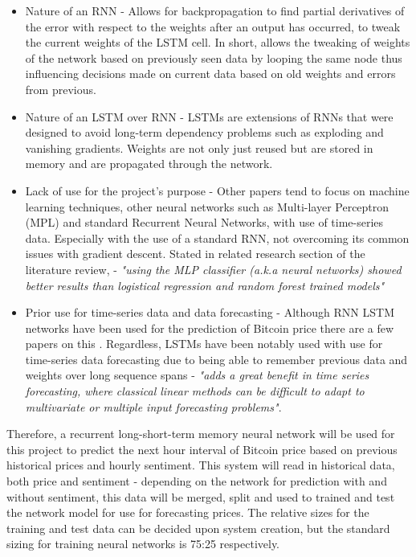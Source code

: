 \documentclass[oneside, 12pt]{article}
\begin{document}
		\begin{itemize}
			\item Nature of an RNN - Allows for backpropagation to find partial derivatives of the error with respect to the weights after an output has occurred, to tweak the current weights of the LSTM cell. In short, allows the tweaking of weights of the network based on previously seen data by looping the same node thus influencing decisions made on current data based on old weights and errors from previous.
			\item Nature of an LSTM over RNN - LSTMs are extensions of RNNs \cite{22} that were designed to avoid long-term dependency problems such as exploding and vanishing gradients. Weights are not only just reused but are stored in memory and are propagated through the network.
			\item Lack of use for the project's purpose - Other papers tend to focus on machine learning techniques, other neural networks such as Multi-layer Perceptron (MPL) and standard Recurrent Neural Networks, with use of time-series data. Especially with the use of a standard RNN, not overcoming its common issues with gradient descent. Stated in related research section of the literature review, \cite{5} - \textit{"using the MLP classifier (a.k.a neural networks) showed better results than logistical regression and random forest trained models"}
			\item Prior use for time-series data and data forecasting - Although RNN LSTM networks have been used for the prediction of Bitcoin price there are a few papers on this \cite{25}. Regardless, LSTMs have been notably used with use for time-series data forecasting due to being able to remember previous data and weights over long sequence spans \cite{25} - \textit{"adds a great benefit in time series forecasting, where classical linear methods can be difficult to adapt to multivariate or multiple input forecasting problems"}.
		\end{itemize}
	
		Therefore, a recurrent long-short-term memory neural network will be used for this project to predict the next hour interval of Bitcoin price based on previous historical prices and hourly sentiment. This system will read in historical data, both price and sentiment - depending on the network for prediction with and without sentiment, this data will be merged, split and used to trained and test the network model for use for forecasting prices. The relative sizes for the training and test data can be decided upon system creation, but the standard sizing for training neural networks is 75:25 respectively.
		
\end{document}
